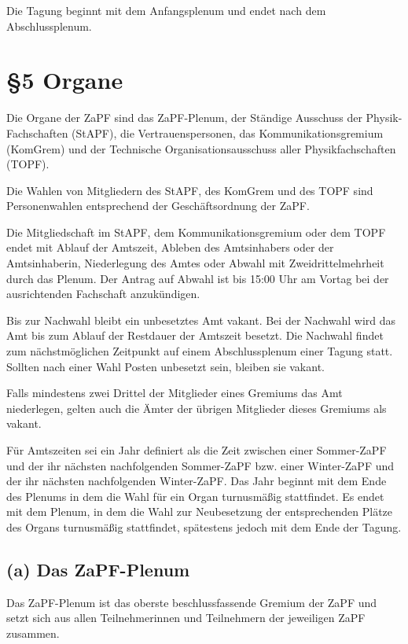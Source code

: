 \documentclass[12pt,oneside]{scrartcl}
\begin{document}
Die Tagung beginnt mit dem Anfangsplenum und endet nach dem Abschlussplenum.


\section{§5 Organe%
  \label{organe}%
}

Die Organe der ZaPF sind das ZaPF-Plenum, der Ständige Ausschuss der
Physik-Fachschaften (StAPF), die Vertrauenspersonen, das Kommunikationsgremium
(KomGrem) und der Technische Organisationsausschuss aller Physikfachschaften
(TOPF).

Die Wahlen von Mitgliedern des StAPF, des KomGrem und des TOPF sind
Personenwahlen entsprechend der Geschäftsordnung der ZaPF.

Die Mitgliedschaft im StAPF, dem Kommunikationsgremium oder dem TOPF endet mit
Ablauf der Amtszeit, Ableben des Amtsinhabers oder der Amtsinhaberin,
Niederlegung des Amtes oder Abwahl mit Zweidrittelmehrheit durch das Plenum. Der
Antrag auf Abwahl ist bis 15:00 Uhr am Vortag bei der ausrichtenden Fachschaft
anzukündigen.

Bis zur Nachwahl bleibt ein unbesetztes Amt vakant. Bei der Nachwahl wird das
Amt bis zum Ablauf der Restdauer der Amtszeit besetzt.
Die Nachwahl findet zum nächstmöglichen Zeitpunkt auf einem Abschlussplenum
einer Tagung statt.
Sollten nach einer Wahl Posten unbesetzt sein, bleiben sie vakant.

Falls mindestens zwei Drittel der Mitglieder eines Gremiums das Amt niederlegen,
gelten auch die Ämter der übrigen Mitglieder dieses Gremiums als vakant.

Für Amtszeiten sei ein Jahr definiert als die Zeit zwischen einer Sommer-ZaPF
und der ihr nächsten nachfolgenden Sommer-ZaPF bzw. einer Winter-ZaPF und der
ihr nächsten nachfolgenden Winter-ZaPF.
Das Jahr beginnt mit dem Ende des Plenums in dem die Wahl für ein Organ
turnusmäßig stattfindet.
Es endet mit dem Plenum, in dem die Wahl zur Neubesetzung der entsprechenden
Plätze des Organs turnusmäßig stattfindet, spätestens jedoch mit dem Ende der
Tagung.


\subsection{(a) Das ZaPF-Plenum%
  \label{a-das-zapf-plenum}%
}

Das ZaPF-Plenum ist das oberste beschlussfassende Gremium der ZaPF und setzt
sich aus allen Teilnehmerinnen und Teilnehmern der jeweiligen ZaPF zusammen.
\end{document}
